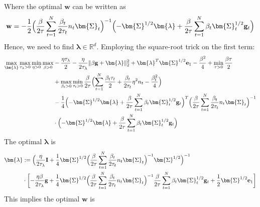 \documentclass[final]{l4dc2026}
\newcommand{\bSigma}{\bm{\Sigma}}
\newcommand{\blambda}{\bm{\lambda}}
\newcommand{\bI}{\mathbf{I}}
\newcommand{\be}{\mathbf{e}}
\newcommand{\bg}{\mathbf{g}}
\newcommand{\bw}{\mathbf{w}}
\newcommand{\bbR}{\mathbb{R}}
\begin{document}
Where the optimal $\bw$ can be written as
\begin{align*}
    \bw = -\frac{1}{2}\Bigl(\frac{\beta}{2\tau}\sum_{t=1}^N \frac{\beta_t}{2\tau_t} n_t \bSigma_t \Bigr)^{-1}\Bigl(-\bSigma^{1/2} \blambda + \frac{\beta}{2\tau}\sum_{t=1}^N \beta_t \bSigma_t^{1/2}\bg_t\Bigr)
\end{align*}
Hence, we need to find $\blambda \in \bbR^{d}$. Employing the square-root trick on the first term:
\begin{align*}
    \max_{\blambda}\max_{\tau_{\lambda}>0} \min_{\eta > 0} \max_{\beta>0} & -\frac{\eta \tau_{\lambda}}{2} - \frac{\eta}{2\tau_{\lambda}}  \|\beta \bg + \blambda\|_2^2 +\blambda ^T \bSigma^{1/2} \be_1 - \frac{\beta^2}{4} + \min_{ \tau>0} \frac{\beta \tau}{2}\\
    &+\max_{\beta_t>0} \min_{\tau_t>0} \frac{\beta}{2\tau} \Bigl( \sum_{t=1}^N \frac{\beta_t \tau_t}{2} + \frac{\beta_t}{2\tau_t} \eta^2 n_t - \frac{\beta_t^2}{4}\Bigr)\\
     &-\frac{1}{4}\Bigl(-\bSigma^{1/2} \blambda + \frac{\beta}{2\tau}\sum_{t=1}^N \beta_t \bSigma_t^{1/2}\bg_t\Bigr)^T \Bigl(\frac{\beta}{2\tau}\sum_{t=1}^N \frac{\beta_t}{2\tau_t} n_t \bSigma_t \Bigr)^{-1}\\
     &\cdot\Bigl(-\bSigma^{1/2} \blambda + \frac{\beta}{2\tau}\sum_{t=1}^N \beta_t \bSigma_t^{1/2}\bg_t\Bigr)
\end{align*}
The optimal $\blambda$ is
\begin{align*}
    \blambda &:= \Bigl(\frac{\eta}{2\tau_{\lambda}}\bI+\frac{1}{4}\bSigma^{1/2} \Bigl(\frac{\beta}{2\tau}\sum_{t=1}^N \frac{\beta_t}{2\tau_t} n_t \bSigma_t \Bigr)^{-1}\bSigma^{1/2}\Bigr)^{-1} \\ 
    &\cdot \biggl[-\frac{\eta \beta}{2\tau_{\lambda}} \bg + \frac{1}{4} \bSigma^{1/2} \Bigl(\frac{\beta}{2\tau}\sum_{t=1}^N \frac{\beta_t}{2\tau_t} n_t \bSigma_t \Bigr)^{-1} \frac{\beta}{2\tau}\sum_{t=1}^N \beta_t \bSigma_t^{1/2}\bg_t + \frac{1}{2} \bSigma^{1/2} \be_1 \biggr]
\end{align*}
This implies the optimal $\bw$ is
\end{document}
